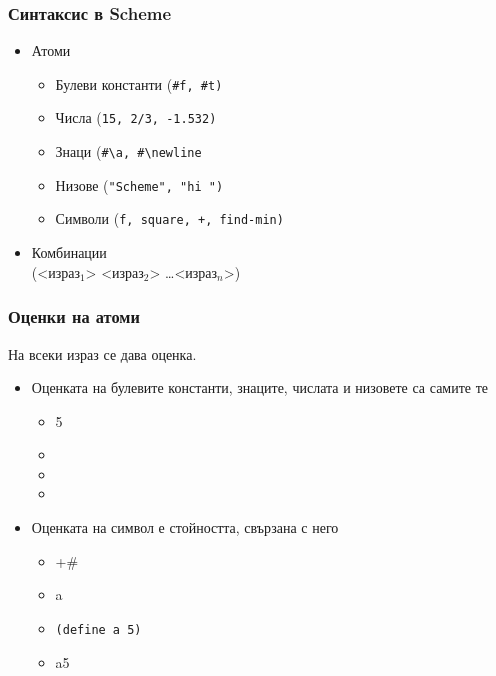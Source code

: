 \documentclass{beamer}
\begin{document}
\begin{frame}
  \frametitle{Синтаксис в Scheme}

  \begin{itemize}
  \item Атоми
    \begin{itemize}
    \item Булеви константи (\tt{\#f}, \tt{\#t})
    \item Числа (\tt{15}, \tt{2/3}, \tt{-1.532})
    \item Знаци (\tt{\#\textbackslash a}, \tt{\#\textbackslash newline}
    \item Низове (\tt{"Scheme"}, \tt{"hi "})
    \item Символи (\tt f, \tt{square}, \tt +, \tt{find-min})
    \end{itemize}
  \item Комбинации\\
    \vspace{1em}
    \alert({}<израз$_1$> <израз$_2$> \ldots <израз$_n$>\alert)
  \end{itemize}
\end{frame}

\begin{frame}[fragile]
  \frametitle{Оценки на атоми}

  На всеки израз се дава оценка.
  \begin{itemize}[<+->]
  \item Оценката на булевите константи, знаците, числата и низовете са самите те
    \begin{itemize}
    \item {} 5
    \item {}
    \item {}
    \item {}
    \end{itemize}
  \item Оценката на символ е стойността, свързана с него
    \begin{itemize}
    \item \evalsto +{\#<procedure:+>}
    \item \evalstoerr a
    \item \tt{(define a 5)}
    \item \evalsto a5
    \end{itemize}
  \end{itemize}
\end{frame}
\end{document}
